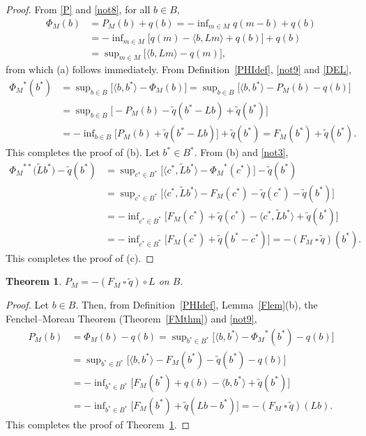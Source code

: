 \documentclass[letterpaper]{article}
\theoremstyle{plain}
\newtheorem{theorem}{Theorem}[section]
\theoremstyle{definition}
\numberwithin{equation}{section}
\newcommand{\bra}[2]{\langle#1,#2\rangle}
\newcommand{\dbs}{^{**}}
\newcommand{\infn}{\inf\nolimits}
\newcommand{\Lt}{{\wt L}}
\newcommand{\qt}{\wt q}
\newcommand{\ssquare}{\ \square\ }
\newcommand{\supn}{\sup\nolimits}
\newcommand{\wt}{\widetilde}
\newcommand{\Def}{Definition~\ref}
\newcommand{\Lem}{Lemma~\ref}
\newcommand{\Thm}{Theorem~\ref}
\begin{document}
\begin{proof}
From \eqref{P} and \eqref{not8}, for all $b \in B$, 
%
\begin{align*}
\Phi_M(b) &= P_M(b) + q(b) = -\infn_{m \in M} q(m - b) + q(b)\\
&= -\infn_{m \in M}\big[q(m) - \bra{b}{Lm} + q(b)\big] + q(b)\\
&=  \supn_{m \in M}\big[\bra{b}{Lm} - q(m)\big],
\end{align*}
%
from which (a) follows immediately.   From \Def{PHIdef}, \eqref{not9} and \eqref{DEL},  
%
\begin{align*}
{\Phi_M}^*(b^*) &= \supn_{b \in B}\big[\bra{b}{b^*} - \Phi_M(b)\big]
= \supn_{b \in B}\big[\bra{b}{b^*} - P_M(b) - q(b)]\\
&= \supn_{b \in B}\big[- P_M(b) -  \qt(b^* - Lb) + \qt(b^*)\big]\\
&= -\infn_{b \in B}\big[P_M(b) + \qt(b^* - Lb)\big] + \qt(b^*) = F_M(b^*) + \qt(b^*).
\end{align*}
%
This completes the proof of (b).
Let $b^* \in B^*$.  From (b) and \eqref{not3},
\begin{align*}
{\Phi_M}\dbs\big(\Lt b^*\big) -  \qt(b^*) 
&= \supn_{c^* \in B^*}\big[\bra{c^*}{\Lt b^*} - {\Phi_M}^*(c^*)\big] -  \qt(b^*)\\
&= \supn_{c^* \in B^*}\big[\bra{c^*}{\Lt b^*} - F_M(c^*) - \qt(c^*) - \qt(b^*)\big]\\
&= -\infn_{c^* \in B^*}\big[F_M(c^*) + \qt(c^*) -\bra{c^*}{\Lt b^*} + \qt(b^*)\big]\\
&= -\infn_{c^* \in B^*}\big[F_M(c^*) + \qt(b^* - c^*)\big] = - (F_M \ssquare \qt)(b^*).
\end{align*}
This completes the proof of (c).
\end{proof}
%
\begin{theorem}\label{PMFMqt}
$P_M = - (F_M \ssquare \qt) \circ L$ on $B$.
\end{theorem}
\begin{proof}Let $b \in B$.   Then, from \Def{PHIdef}, \Lem{Flem}(b), the Fenchel--Moreau Theorem (\Thm{FMthm}) and \eqref{not9},  
%
\begin{align*}
P_M(b) &= \Phi_M(b) - q(b) = \supn_{b^* \in B^*}\big[\bra{b}{b^*} - {\Phi_M}^*(b^*) - q(b)\big]\\
&= \supn_{b^* \in B^*}\big[\bra{b}{b^*} - F_M(b^*) -\qt(b^*) - q(b)\big]\\
&= -\infn_{b^* \in B^*}\big[F_M(b^*) + q(b) - \bra{b}{b^*} + \qt(b^*)\big]\\
&= -\infn_{b^* \in B^*}\big[F_M(b^*) + \qt(Lb - b^*)\big] = - (F_M \ssquare \qt)(Lb).
\end{align*}
%
This completes the proof of \Thm{PMFMqt}. 
\end{proof}
\end{document}
